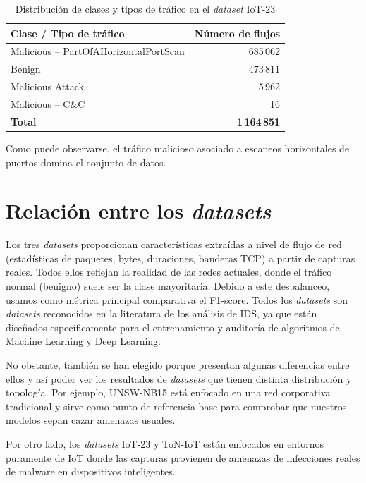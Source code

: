 \begin{table}[H]
    \centering
    \caption{Distribución de clases y tipos de tráfico en el \textit{dataset} IoT-23}
    \label{tab:iot23-ataques}
    \begin{tabular}{|l|r|}
        \hline
        \textbf{Clase / Tipo de tráfico} & \textbf{Número de flujos} \\
        \hline
        Malicious -- PartOfAHorizontalPortScan & 685\,062 \\
        Benign & 473\,811 \\
        Malicious Attack & 5\,962 \\
        Malicious -- C\&C & 16 \\
        \hline
        \textbf{Total} & \textbf{1\,164\,851} \\
        \hline
    \end{tabular}
\end{table}

Como puede observarse, el tráfico malicioso asociado a escaneos horizontales de puertos domina el conjunto de datos.

\section{Relación entre los \textit{datasets}}

Los tres \textit{datasets} proporcionan características extraídas a nivel de flujo de red (estadísticas de paquetes, bytes, duraciones, banderas TCP) a partir de capturas reales.
Todos ellos reflejan la realidad de las redes actuales, donde el tráfico normal (benigno) suele ser la clase mayoritaria. Debido a este desbalanceo, usamos como métrica principal comparativa el F1-score.
Todos los \textit{datasets} son \textit{datasets} reconocidos en la literatura de los análisis de IDS, ya que están diseñados específicamente para el entrenamiento y auditoría de algoritmos de Machine Learning y Deep Learning.

No obstante, también se han elegido porque presentan algunas diferencias entre ellos y así poder ver los resultados de \textit{datasets} que tienen distinta distribución y topología. 
Por ejemplo, UNSW-NB15 está enfocado en una red corporativa tradicional y sirve como punto de referencia base para comprobar que nuestros modelos sepan cazar amenazas usuales.

Por otro lado, los \textit{datasets} IoT-23 y ToN-IoT están enfocados en entornos puramente de IoT donde las capturas provienen de amenazas de infecciones reales de malware en dispositivos inteligentes.

